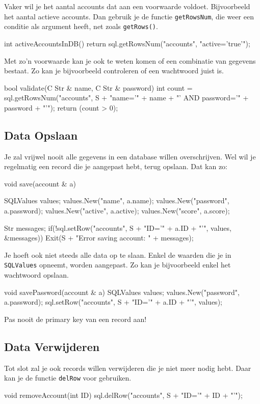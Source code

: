 Vaker wil je het aantal accounts dat aan een voorwaarde voldoet. Bijvoorbeeld het aantal actieve accounts. Dan gebruik je de functie \texttt{getRowsNum}, die weer een conditie als argument heeft, net zoals \texttt{getRows()}.

\begin{code}
int activeAccountsInDB() {
  return sql.getRowsNum("accounts", "active='true'");
}
\end{code}

Met zo'n voorwaarde kan je ook te weten komen of een combinatie van gegevens bestaat. Zo kan je bijvoorbeeld controleren of een wachtwoord juist is.

\begin{code}
bool validate(C Str & name, C Str & password) {
  int count = sql.getRowsNum("accounts", S + "name='" + name + "' AND password='" + password + "'");
	return (count > 0);
}
\end{code}

\subsection{Data Opslaan}
Je zal vrijwel nooit alle gegevens in een database willen overschrijven. Wel wil je regelmatig een record die je aangepast hebt, terug opslaan. Dat kan zo:

\begin{code}
void save(account & a) {
  SQLValues values;
	values.New("name", a.name);
	values.New("password", a.password);
	values.New("active", a.active);
	values.New("score", a.score);
	
	Str messages;
	if(!sql.setRow("accounts", S + "ID='" + a.ID + "'", values, &messages)) {
	  Exit(S + "Error saving account: \n" + messages);
	}
}
\end{code}

Je hoeft ook niet steeds alle data op te slaan. Enkel de waarden die je in \texttt{SQLValues} opneemt, worden aangepast. Zo kan je bijvoorbeeld enkel het wachtwoord opslaan.

\begin{code}
void savePassword(account & a) {
  SQLValues values;
	values.New("password", a.password);
	sql.setRow("accounts", S + "ID='" + a.ID + "'", values);
}
\end{code}


\begin{note}
Pas nooit de primary key van een record aan!
\end{note}

\subsection{Data Verwijderen}
Tot slot zal je ook records willen verwijderen die je niet meer nodig hebt. Daar kan je de functie \texttt{delRow} voor gebruiken. 

\begin{code}
void removeAccount(int ID) {
  sql.delRow("accounts", S + "ID='" + ID + "'");
}
\end{code}
